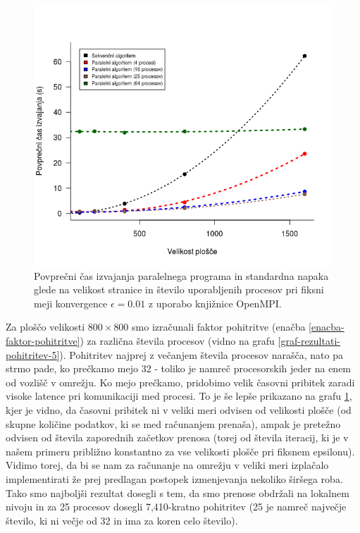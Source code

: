 \documentclass[a4paper,titlepage,11pt]{article}
\begin{document}
\begin{figure}[H]
\begin{center}
\includegraphics[scale=0.6]{graf-rezultati-5_1.png}
\caption{Povprečni čas izvajanja paralelnega programa in standardna napaka glede na velikost stranice in število uporabljenih procesov pri fiksni meji konvergence $\epsilon = 0.01$ z uporabo knjižnice OpenMPI.}
\label{graf-rezultati-5}
\end{center}
\vspace{-25pt}
\end{figure}

Za ploščo velikosti \(800 \times 800\) smo izračunali faktor pohitritve (enačba \ref{enacba-faktor-pohitritve}) za različna števila procesov (vidno na grafu \ref{graf-rezultati-pohitritev-5}). Pohitritev najprej z večanjem števila procesov narašča, nato pa strmo pade, ko prečkamo mejo 32 - toliko je namreč procesorskih jeder na enem od vozlišč v omrežju. Ko mejo prečkamo, pridobimo velik časovni pribitek zaradi visoke latence pri komunikaciji med procesi. To je še lepše prikazano na grafu \ref{graf-rezultati-5}, kjer je vidno, da časovni pribitek ni v veliki meri odvisen od velikosti plošče (od skupne količine podatkov, ki se med računanjem prenaša), ampak je pretežno odvisen od števila zaporednih začetkov prenosa (torej od števila iteracij, ki je v našem primeru približno konstantno za vse velikosti plošče pri fiksnem epsilonu). Vidimo torej, da bi se nam za računanje na omrežju v veliki meri izplačalo implementirati že prej predlagan postopek izmenjevanja nekoliko širšega roba. Tako smo najboljši rezultat dosegli s tem, da smo prenose obdržali na lokalnem nivoju in za 25 procesov dosegli 7,410-kratno pohitritev (25 je namreč največje število, ki ni večje od 32 in ima za koren celo število).
\end{document}
